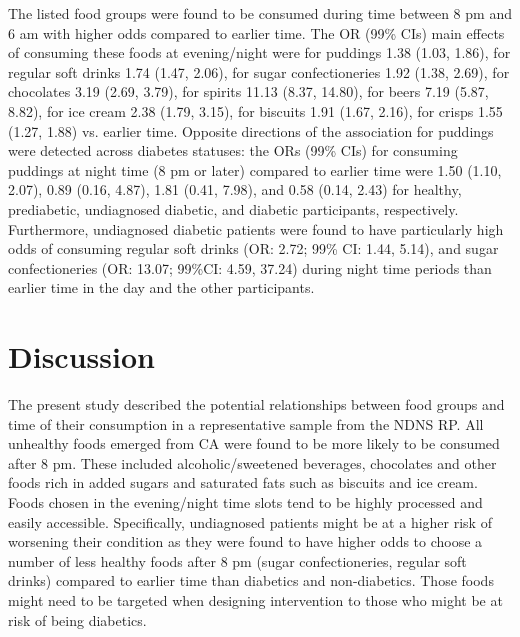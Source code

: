 \documentclass{bmcart}
\begin{document}
The listed food groups were found to be consumed during time between 8 pm and 6 am with higher odds compared to earlier time. The OR (99\% CIs) main effects of consuming these foods at evening/night were for puddings 1.38 (1.03, 1.86), for regular soft drinks 1.74 (1.47, 2.06), for sugar confectioneries 1.92 (1.38, 2.69), for chocolates 3.19 (2.69, 3.79), for spirits 11.13 (8.37, 14.80), for beers 7.19 (5.87, 8.82), for ice cream 2.38 (1.79, 3.15), for biscuits 1.91 (1.67, 2.16), for crisps 1.55 (1.27, 1.88) vs. earlier time. Opposite directions of the association for puddings were detected across diabetes statuses: the ORs (99\% CIs) for consuming puddings at night time (8 pm or later) compared to earlier time were 1.50 (1.10, 2.07),	0.89 (0.16, 4.87),	1.81 (0.41, 7.98), and	0.58 (0.14, 2.43) for healthy, prediabetic, undiagnosed diabetic, and diabetic participants, respectively. Furthermore, undiagnosed diabetic patients were found to have particularly high odds of consuming regular soft drinks (OR: 2.72; 99\% CI: 1.44, 5.14), and sugar confectioneries (OR: 13.07; 99\%CI: 4.59, 37.24) during night time periods than earlier time in the day and the other participants. 




\section*{Discussion}


The present study described the potential relationships between food groups and time of their consumption in a representative sample from the NDNS RP. All unhealthy foods emerged from CA were found to be more likely to be consumed after 8 pm. These included alcoholic/sweetened beverages, chocolates and other foods rich in added sugars and saturated fats such as biscuits and ice cream. Foods chosen in the evening/night time slots tend to be highly processed and easily accessible. Specifically, undiagnosed patients might be at a higher risk of worsening their condition as they were found to have higher odds to choose a number of less healthy foods after 8 pm (sugar confectioneries, regular soft drinks) compared to earlier time than diabetics and non-diabetics. Those foods might need to be targeted when designing intervention to those who might be at risk of being diabetics. 
\end{document}

